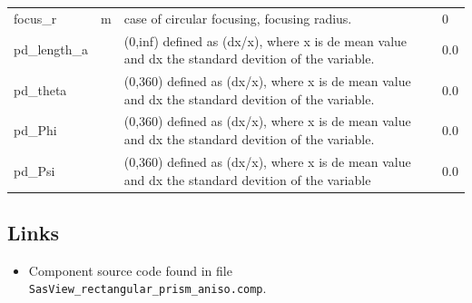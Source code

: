 \begin{longtable}{p{}p{}p{}p{}}
focus\_r & m & case of circular focusing, focusing radius. & 0 \\
pd\_length\_a &  & (0,inf) defined as (dx/x), where x is de mean value and dx the standard devition of the variable. & 0.0 \\
pd\_theta &  & (0,360) defined as (dx/x), where x is de mean value and dx the standard devition of the variable. & 0.0 \\
pd\_Phi &  & (0,360) defined as (dx/x), where x is de mean value and dx the standard devition of the variable. & 0.0 \\
pd\_Psi &  & (0,360) defined as (dx/x), where x is de mean value and dx the standard devition of the variable & 0.0 \\
\bottomrule
\end{longtable}

\subsection*{Links}
\begin{itemize}
  \item Component source code found in file \texttt{SasView\_rectangular\_prism\_aniso.comp}.
\end{itemize}
